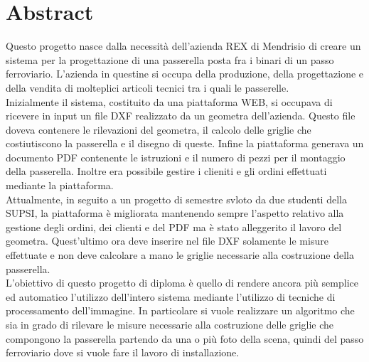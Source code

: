 \documentclass[twoside]{supsistudent}
\begin{document}
\maketitle
\onehalfspacing
\frontmatter


\tableofcontents

\mainmatter %
\setcounter{page}{1}

\chapter{Abstract}
Questo progetto nasce dalla necessità dell'azienda REX di Mendrisio di creare un sistema
per la progettazione di una passerella posta fra i binari di un passo ferroviario. L'azienda
in questine si occupa della produzione, della progettazione e della vendita di molteplici 
articoli tecnici tra i quali le passerelle. \\

Inizialmente il sistema, costituito da una piattaforma WEB, si occupava di ricevere in input un file DXF realizzato da un geometra 
dell'azienda. Questo file doveva contenere le rilevazioni del geometra, il calcolo delle griglie che costiutiscono la passerella e 
il disegno di queste. Infine la piattaforma generava un documento PDF contenente le istruzioni e il numero di pezzi per il montaggio della passerella.
Inoltre era possibile gestire i clieniti e gli ordini effettuati mediante la piattaforma. \\

Attualmente, in seguito a un progetto di semestre svloto da due studenti della SUPSI, la piattaforma è migliorata mantenendo sempre 
l'aspetto relativo alla gestione degli ordini, dei clienti e del PDF ma è stato alleggerito il lavoro del geometra. Quest'ultimo ora deve inserire 
nel file DXF solamente le misure effettuate e non deve calcolare a mano le griglie necessarie alla costruzione della passerella. \\

L'obiettivo di questo progetto di diploma è quello di rendere ancora più semplice ed automatico l'utilizzo dell'intero sistema mediante l'utilizzo 
di tecniche di processamento dell'immagine. In particolare si vuole realizzare un algoritmo che sia in grado di rilevare le misure necessarie alla costruzione
delle griglie che compongono la passerella partendo da una o più foto della scena, quindi del passo ferroviario dove si vuole fare il lavoro di installazione. \\
\end{document}
